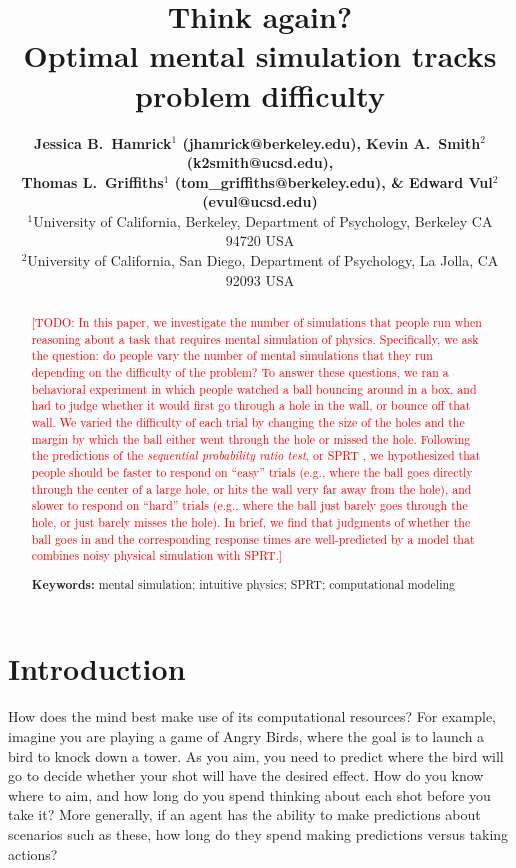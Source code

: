\documentclass[10pt,letterpaper]{article}
\title{Think again?\\ Optimal mental simulation tracks problem difficulty}
\author{{\large \bf Jessica B.~Hamrick$^1$ (jhamrick@berkeley.edu),
    Kevin A.~Smith$^2$ (k2smith@ucsd.edu),}\\
    {\large \bf Thomas L.~Griffiths$^1$ (tom\_griffiths@berkeley.edu),
      \& Edward Vul$^2$ (evul@ucsd.edu)}\\
    $^1$University of California, Berkeley, Department of Psychology, Berkeley CA 94720 USA\\
    $^2$University of California, San Diego, Department of Psychology, La Jolla, CA 92093 USA}
\newcommand{\TODO}[1]{\textcolor{red}{[TODO: #1]}}
\begin{document}
\maketitle

\begin{abstract}
\TODO{In this paper, we investigate the number of simulations that people run when reasoning about a task that requires mental simulation of physics. 
Specifically, we ask the question: do people vary the number of mental simulations that they run depending on the difficulty of the problem?
To answer these questions, we ran a behavioral experiment in which people watched a ball bouncing around in a box, and had to judge whether it would first go through a hole in the wall, or bounce off that wall. 
We varied the difficulty of each trial by changing the size of the holes and the margin by which the ball either went through the hole or missed the hole. 
Following the predictions of the \emph{sequential probability ratio test}, or SPRT \cite{wald1947sequential}, we hypothesized that people should be faster to respond on ``easy'' trials (e.g., where the ball goes directly through the center of a large hole, or hits the wall very far away from the hole), and slower to respond on ``hard'' trials (e.g., where the ball just barely goes through the hole, or just barely misses the hole). 
In brief, we find that judgments of whether the ball goes in and the corresponding response times are well-predicted by a model that combines noisy physical simulation with SPRT.}

\textbf{Keywords:} 
mental simulation; intuitive physics; SPRT; computational modeling
\end{abstract}

\section{Introduction}

How does the mind best make use of its computational resources?
For example, imagine you are playing a game of Angry Birds, where the goal is to launch a bird to knock down a tower. 
As you aim, you need to predict where the bird will go to decide whether your shot will have the desired effect. 
How do you know where to aim, and how long do you spend thinking about each shot before you take it? 
More generally, if an agent has the ability to make predictions about scenarios such as these, how long do they spend making predictions versus taking actions?
\end{document}
